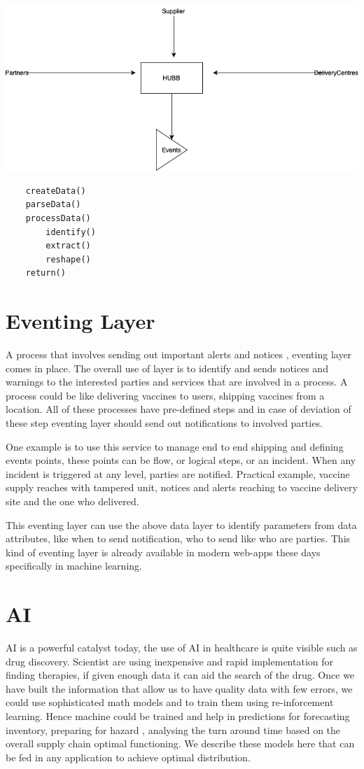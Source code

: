 \documentclass{article}
\begin{document}
\includegraphics[scale=0.5]{hubb}


\begin{lstlisting}
	createData()
	parseData()
	processData()
		identify()
		extract()
		reshape()
	return()	
\end{lstlisting}

   
\section{Eventing Layer}

A process that involves sending out important alerts and notices	, eventing layer comes in place. The overall use of  layer is to identify and sends notices and warnings to the interested parties and services that are involved in a process. A process could be like delivering vaccines to users, shipping vaccines from a location. All of these processes have pre-defined steps and in case of deviation of these step eventing layer should send out notifications to involved parties.

One example is to use this service to manage end to end shipping and defining events points, these points can be flow, or logical steps, or an incident. When any incident is triggered at any level, parties are notified. Practical example, vaccine supply reaches with tampered unit, notices and alerts reaching to vaccine delivery site and the one who delivered.

This eventing layer can use the above data layer to identify parameters from data attributes, like when to send notification, who to send like who are parties. This kind of eventing layer is already available in modern web-apps these days specifically in machine learning.

\section{AI}
AI is a powerful catalyst today, the use of AI in healthcare is quite visible such as  drug discovery. Scientist are using inexpensive and rapid implementation for finding therapies, if given enough data it can aid the search of the drug\cite{keshavarzi2020artificial}. Once we have built the information that allow us to have quality data with few errors, we could use sophisticated math models and to train them using re-inforcement learning. Hence machine could be trained and  help in predictions for forecasting inventory, preparing for hazard , analysing the turn around time based on the overall supply chain optimal functioning. We describe these models here that can be fed in any application to achieve optimal distribution.
\end{document}
